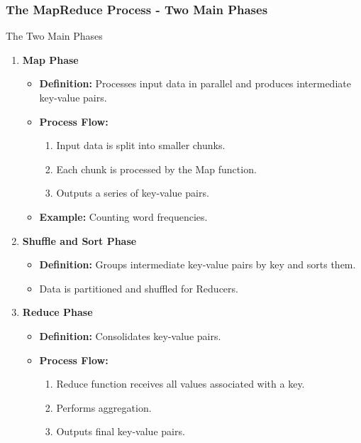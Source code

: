 \documentclass[aspectratio=169]{beamer}
\begin{document}
\begin{frame}[fragile]
    \frametitle{The MapReduce Process - Two Main Phases}
    \begin{block}{The Two Main Phases}
        \begin{enumerate}
            \item \textbf{Map Phase}
            \begin{itemize}
                \item \textbf{Definition:} Processes input data in parallel and produces intermediate key-value pairs.
                \item \textbf{Process Flow:}
                \begin{enumerate}
                    \item Input data is split into smaller chunks.
                    \item Each chunk is processed by the Map function.
                    \item Outputs a series of key-value pairs.
                \end{enumerate}
                \item \textbf{Example:} Counting word frequencies.
            \end{itemize}
            \item \textbf{Shuffle and Sort Phase}
            \begin{itemize}
                \item \textbf{Definition:} Groups intermediate key-value pairs by key and sorts them.
                \item Data is partitioned and shuffled for Reducers.
            \end{itemize}
            \item \textbf{Reduce Phase}
            \begin{itemize}
                \item \textbf{Definition:} Consolidates key-value pairs.
                \item \textbf{Process Flow:}
                \begin{enumerate}
                    \item Reduce function receives all values associated with a key.
                    \item Performs aggregation.
                    \item Outputs final key-value pairs.
                \end{enumerate}
            \end{itemize}
        \end{enumerate}
    \end{block}
\end{frame}
\end{document}
